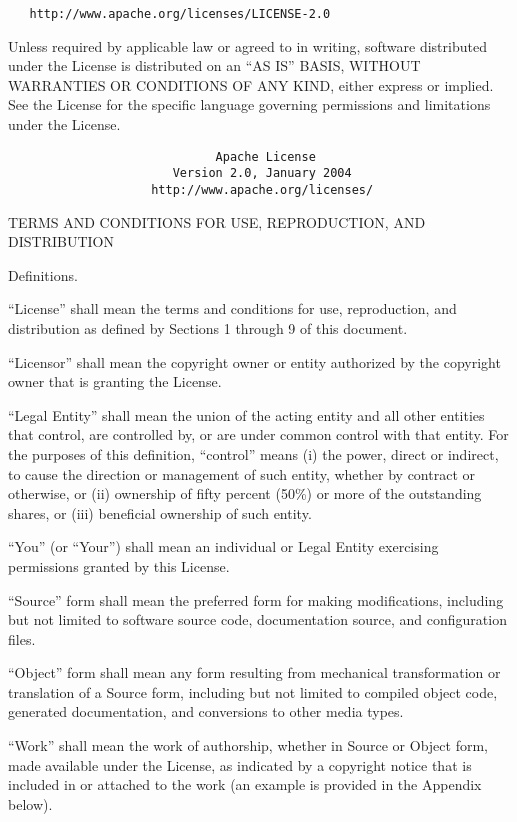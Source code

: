 \documentclass{article}
\begin{document}
\begin{verbatim}
   http://www.apache.org/licenses/LICENSE-2.0
\end{verbatim}
Unless required by applicable law or agreed to in writing, software
distributed under the License is distributed on an ``AS IS'' BASIS,
WITHOUT WARRANTIES OR CONDITIONS OF ANY KIND, either express or
implied. See the License for the specific language governing
permissions and limitations under the License.

\begin{verbatim}
                             Apache License
                       Version 2.0, January 2004
                    http://www.apache.org/licenses/
\end{verbatim}
TERMS AND CONDITIONS FOR USE, REPRODUCTION, AND DISTRIBUTION

  Definitions.

  ``License'' shall mean the terms and conditions for use,
  reproduction, and distribution as defined by Sections 1 through 9
  of this document.

  ``Licensor'' shall mean the copyright owner or entity authorized by
  the copyright owner that is granting the License.

  ``Legal Entity'' shall mean the union of the acting entity and all
  other entities that control, are controlled by, or are under common
  control with that entity. For the purposes of this definition,
  ``control'' means (i) the power, direct or indirect, to cause the
  direction or management of such entity, whether by contract or
  otherwise, or (ii) ownership of fifty percent (50\%) or more of the
  outstanding shares, or (iii) beneficial ownership of such entity.

  ``You'' (or ``Your'') shall mean an individual or Legal Entity
  exercising permissions granted by this License.

  ``Source'' form shall mean the preferred form for making
  modifications, including but not limited to software source code,
  documentation source, and configuration files.

  ``Object'' form shall mean any form resulting from mechanical
  transformation or translation of a Source form, including but not
  limited to compiled object code, generated documentation, and
  conversions to other media types.

  ``Work'' shall mean the work of authorship, whether in Source or
  Object form, made available under the License, as indicated by a
  copyright notice that is included in or attached to the work (an
  example is provided in the Appendix below).
\end{document}

